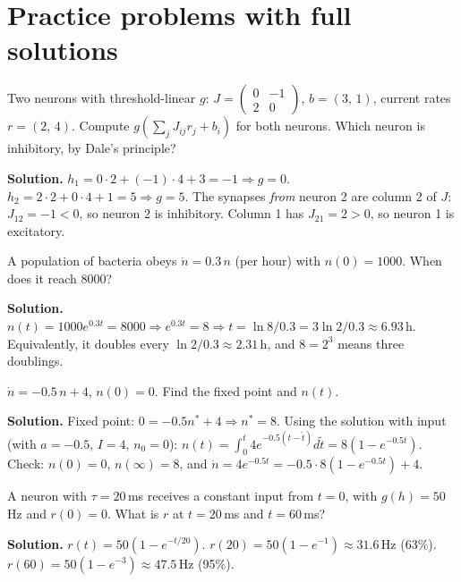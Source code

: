 
\section{Practice problems with full solutions}

\begin{example}
Two neurons with threshold-linear $g$: $J = \begin{pmatrix}0 & -1\\ 2 & 0\end{pmatrix}$, $b = (3,\,1)$, current rates $r=(2,\,4)$.
Compute $g(\sum_jJ_{ij}r_j+b_i)$ for both neurons. Which neuron is inhibitory, by Dale's principle?

\textbf{Solution.} $h_1 = 0\cdot2 + (-1)\cdot4 + 3 = -1 \Rightarrow g = 0$. \quad $h_2 = 2\cdot2 + 0\cdot4 + 1 = 5 \Rightarrow g = 5$.
The synapses \emph{from} neuron 2 are column 2 of $J$: $J_{12}=-1<0$, so neuron 2 is inhibitory. Column 1 has $J_{21}=2>0$, so neuron 1 is excitatory.
\end{example}

\begin{example}[P2: Solving $\dot n = an$]
A population of bacteria obeys $\dot n = 0.3\,n$ (per hour) with $n(0)=1000$. When does it reach $8000$?

\textbf{Solution.} $n(t) = 1000e^{0.3t} = 8000 \Rightarrow e^{0.3t}=8 \Rightarrow t = \ln 8/0.3 = 3\ln2/0.3 \approx 6.93$\,h.
Equivalently, it doubles every $\ln2/0.3\approx 2.31$\,h, and $8 = 2^3$ means three doublings.
\end{example}

\begin{example}
$\dot n = -0.5\,n + 4$, $n(0)=0$. Find the fixed point and $n(t)$.

\textbf{Solution.} Fixed point: $0 = -0.5n^*+4 \Rightarrow n^*=8$. Using the solution with input (with $a=-0.5$, $I=4$, $n_0=0$):
$n(t) = \int_0^t 4e^{-0.5(t-\tilde t)}d\tilde t = 8(1-e^{-0.5t})$. Check: $n(0)=0$, $n(\infty)=8$, and $\dot n = 4e^{-0.5t} = -0.5\cdot 8(1-e^{-0.5t}) + 4$. \checkmark
\end{example}

\begin{example}
A neuron with $\tau = 20$\,ms receives a constant input from $t=0$, with $g(h) = 50$\,Hz and $r(0)=0$. What is $r$ at $t=20$\,ms and $t=60$\,ms?

\textbf{Solution.} $r(t) = 50(1-e^{-t/20})$. $r(20) = 50(1-e^{-1}) \approx 31.6$\,Hz (63\%). $r(60) = 50(1-e^{-3})\approx 47.5$\,Hz (95\%).
\end{example}

